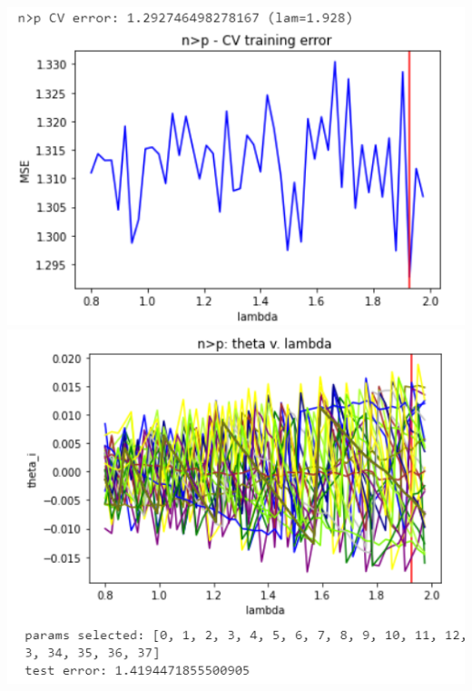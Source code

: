 \documentclass[11pt]{article}
\begin{document}
\begin{center}
\includegraphics[scale=0.7]{charts/bgd_corr_n_gt_p_err.PNG}
\includegraphics[scale=0.7]{charts/bgd_corr_n_gt_p_thetas.PNG}
\end{center}
\end{document}
